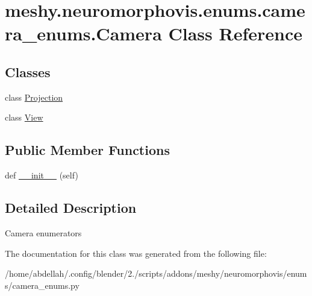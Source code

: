 \hypertarget{classmeshy_1_1neuromorphovis_1_1enums_1_1camera__enums_1_1Camera}{}\section{meshy.\+neuromorphovis.\+enums.\+camera\+\_\+enums.\+Camera Class Reference}
\label{classmeshy_1_1neuromorphovis_1_1enums_1_1camera__enums_1_1Camera}


 


\subsection*{Classes}
\begin{DoxyCompactItemize}
\item 
class \hyperlink{classmeshy_1_1neuromorphovis_1_1enums_1_1camera__enums_1_1Camera_1_1Projection}{Projection}
\item 
class \hyperlink{classmeshy_1_1neuromorphovis_1_1enums_1_1camera__enums_1_1Camera_1_1View}{View}
\end{DoxyCompactItemize}
\subsection*{Public Member Functions}
\begin{DoxyCompactItemize}
\item 
def \hyperlink{classmeshy_1_1neuromorphovis_1_1enums_1_1camera__enums_1_1Camera_a94c5d21461ee33182752659b69e34926}{\+\_\+\+\_\+init\+\_\+\+\_\+} (self)\hypertarget{classmeshy_1_1neuromorphovis_1_1enums_1_1camera__enums_1_1Camera_a94c5d21461ee33182752659b69e34926}{}\label{classmeshy_1_1neuromorphovis_1_1enums_1_1camera__enums_1_1Camera_a94c5d21461ee33182752659b69e34926}

\end{DoxyCompactItemize}


\subsection{Detailed Description}


\begin{DoxyVerb}Camera enumerators
\end{DoxyVerb}
 

The documentation for this class was generated from the following file\+:\begin{DoxyCompactItemize}
\item 
/home/abdellah/.\+config/blender/2./scripts/addons/meshy/neuromorphovis/enums/camera\+\_\+enums.\+py\end{DoxyCompactItemize}
